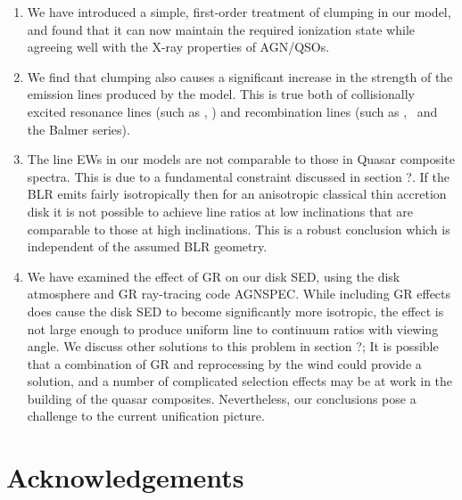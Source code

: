 \documentclass[useAMS,usenatbib]{mn2e_x}
\begin{document}
\begin{enumerate}
\item We have introduced a simple, first-order treatment 
of clumping in our model, and found that it can now maintain
the required ionization state while agreeing well with the X-ray
properties of AGN/QSOs.
\item We find that clumping also causes a significant 
increase in the strength of the  emission
lines produced by the model. This is true both
of collisionally excited resonance lines (such as \civ, \nv)
and recombination lines (such as \la, \ha\ and the Balmer series).
\item The line EWs in our models are not comparable to those in Quasar composite
spectra. This is due to a fundamental constraint discussed in section ?. If the BLR
emits fairly isotropically then for an anisotropic classical thin accretion disk
it is not possible to achieve line ratios at low inclinations that are comparable to
those at high inclinations. This is a robust conclusion which 
is independent of the assumed BLR geometry. 
\item We have examined the effect of GR on our disk SED, using the disk atmosphere
and GR ray-tracing code AGNSPEC. While including GR effects
does cause the disk SED to become significantly more isotropic,
the effect is not large enough to produce uniform line to continuum ratios
with viewing angle. We discuss other solutions to this problem in section ?; 
It is possible that a combination of GR and reprocessing by the wind could provide a 
solution, and a number of complicated selection effects may be at work
in the building of the quasar composites. Nevertheless,
our conclusions pose a challenge to the current unification picture.
\end{enumerate}


\section*{Acknowledgements}




\newpage
\end{document}
